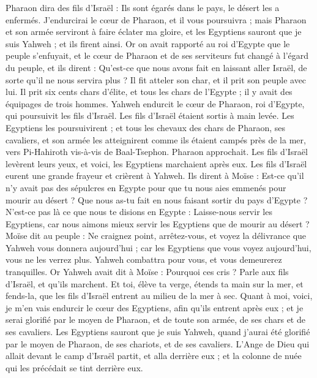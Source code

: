 \begin{multicols}{2}
Pharaon dira des fils d'Israël : Ils sont égarés dans le pays, le désert les a enfermés.
J'endurcirai le cœur de Pharaon, et il vous poursuivra ; mais Pharaon et son armée serviront à faire éclater ma gloire, et les Egyptiens sauront que je suis Yahweh ; et ils firent ainsi.
Or on avait rapporté au roi d'Egypte que le peuple s'enfuyait, et le cœur de Pharaon et de ses serviteurs fut changé à l'égard du peuple, et ils dirent : Qu'est-ce que nous avons fait en laissant aller Israël, de sorte qu'il ne nous servira plus ?
Il fit atteler son char, et il prit son peuple avec lui.
Il prit six cents chars d'élite, et tous les chars de l'Egypte ; il y avait des équipages de trois hommes.
Yahweh endurcit le cœur de Pharaon, roi d'Egypte, qui poursuivit les fils d'Israël. Les fils d'Israël étaient sortis à main levée.
Les Egyptiens les poursuivirent ; et tous les chevaux des chars de Pharaon, ses cavaliers, et son armée les atteignirent comme ils étaient campés près de la mer, vers Pi-Hahiroth vis-à-vis de Baal-Tsephon.
Pharaon approchait. Les fils d'Israël levèrent leurs yeux, et voici, les Egyptiens marchaient après eux. Les fils d'Israël eurent une grande frayeur et crièrent à Yahweh.
Ils dirent à Moïse : Est-ce qu'il n'y avait pas des sépulcres en Egypte pour que tu nous aies emmenés pour mourir au désert ? Que nous as-tu fait en nous faisant sortir du pays d'Egypte ?
N’est-ce pas là ce que nous te disions en Egypte : Laisse-nous servir les Egyptiens, car nous aimons mieux servir les Egyptiens que de mourir au désert ?
Moïse dit au peuple : Ne craignez point, arrêtez-vous, et voyez la délivrance que Yahweh vous donnera aujourd'hui ; car les Egyptiens que vous voyez aujourd'hui, vous ne les verrez plus.
Yahweh combattra pour vous, et vous demeurerez tranquilles.
Or Yahweh avait dit à Moïse : Pourquoi ces cris ? Parle aux fils d'Israël, et qu'ils marchent.
Et toi, élève ta verge, étends ta main sur la mer, et fends-la, que les fils d'Israël entrent au milieu de la mer à sec.
Quant à moi, voici, je m'en vais endurcir le cœur des Egyptiens, afin qu'ils entrent après eux ; et je serai glorifié par le moyen de Pharaon, et de toute son armée, de ses chars et de ses cavaliers.
Les Egyptiens sauront que je suis Yahweh, quand j'aurai été glorifié par le moyen de Pharaon, de ses chariots, et de ses cavaliers.
L'Ange de Dieu qui allait devant le camp d'Israël partit, et alla derrière eux ; et la colonne de nuée qui les précédait se tint derrière eux.

\end{multicols}

